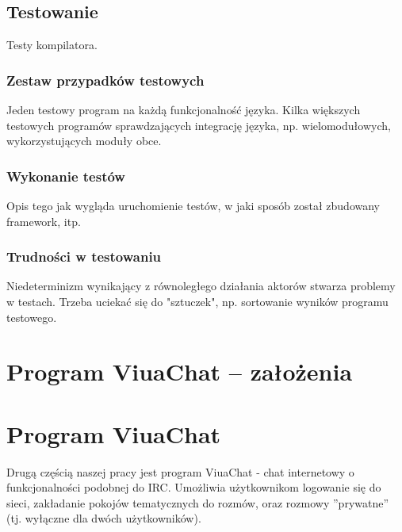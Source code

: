 \documentclass[11pt,oneside,a4paper,titlepage,onecolumn]{book}
\begin{document}




\section{Testowanie}

Testy kompilatora.

\subsection{Zestaw przypadków testowych}

Jeden testowy program na każdą funkcjonalność języka.
Kilka większych testowych programów sprawdzających integrację języka, np. wielomodułowych, wykorzystujących
moduły obce.

\subsection{Wykonanie testów}

Opis tego jak wygląda uruchomienie testów, w jaki sposób został zbudowany framework, itp.

\subsection{Trudności w testowaniu}

Niedeterminizm wynikający z równoległego działania aktorów stwarza problemy w testach. Trzeba uciekać się do
"sztuczek", np. sortowanie wyników programu testowego.



\chapter{Program ViuaChat -- założenia}



\chapter{Program ViuaChat}
\label{program_viuachat}

Drugą częścią naszej pracy jest program ViuaChat - chat internetowy o funkcjonalności podobnej do IRC.
Umożliwia użytkownikom logowanie się do sieci, zakładanie pokojów tematycznych do rozmów, oraz rozmowy
''prywatne'' (tj. wyłączne dla dwóch użytkowników).


\end{document}
